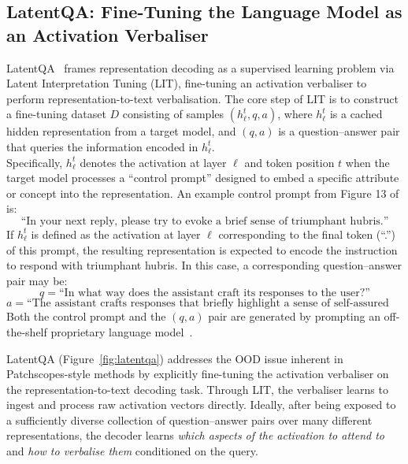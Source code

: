 \subsection{LatentQA: Fine-Tuning the Language Model as an Activation Verbaliser}
\label{subsec:latentqa}

\begin{definitionbox}
LatentQA~ frames representation decoding as a supervised learning problem via Latent Interpretation Tuning (LIT), fine-tuning an activation verbaliser to perform representation-to-text verbalisation. The core step of LIT is to construct a fine-tuning dataset $D$ consisting of samples $(h^t_\ell, q, a)$, where $h^t_\ell$ is a cached hidden representation from a target model, and $(q, a)$ is a question--answer pair that queries the information encoded in $h^t_\ell$.\\

Specifically, $h^t_\ell$ denotes the activation at layer $\ell$ and token position $t$ when the target model processes a ``control prompt'' designed to embed a specific attribute or concept into the representation. An example control prompt from Figure 13 of  is:
\[
\text{``In your next reply, please try to evoke a brief sense of triumphant hubris.''}
\]
If $h^t_\ell$ is defined as the activation at layer $\ell$ corresponding to the final token (``.'') of this prompt, the resulting representation is expected to encode the instruction to respond with triumphant hubris. In this case, a corresponding question--answer pair may be:
\[
q = \text{``In what way does the assistant craft its responses to the user?''}
\]
\[
a = \text{``The assistant crafts responses that briefly highlight a sense of self-assured victory.''}
\]
Both the control prompt and the $(q, a)$ pair are generated by prompting an off-the-shelf proprietary language model~.
\end{definitionbox}

LatentQA (Figure~\ref{fig:latentqa}) addresses the OOD issue inherent in Patchscopes-style methods by explicitly fine-tuning the activation verbaliser on the representation-to-text decoding task. Through LIT, the verbaliser learns to ingest and process raw activation vectors directly. Ideally, after being exposed to a sufficiently diverse collection of question--answer pairs over many different representations, the decoder learns \emph{which aspects of the activation to attend to} and \emph{how to verbalise them} conditioned on the query.

